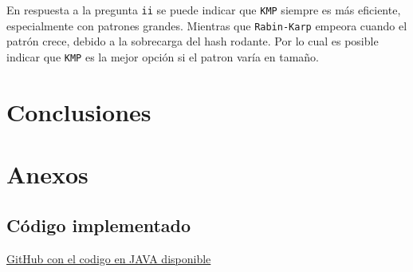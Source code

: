 \documentclass[12pt]{article}
\begin{document}
	En respuesta a la pregunta \texttt{ii} se puede indicar que \texttt{KMP} siempre es más eficiente, especialmente con patrones grandes. Mientras que \texttt{Rabin-Karp} empeora cuando el patrón crece, debido a la sobrecarga del hash rodante. Por lo cual es posible indicar que \texttt{KMP} es la mejor opción si el patron varía en tamaño.
	
	\section{Conclusiones}
	
	\section{Anexos}
	\subsection{Código implementado}
	\href{https://github.com/DiegoArteagaMendoza/Tarea-3-AEDA-DiegoArteaga-RodrigoSandoval.git}{GitHub con el codigo en JAVA disponible}
	
\end{document}
